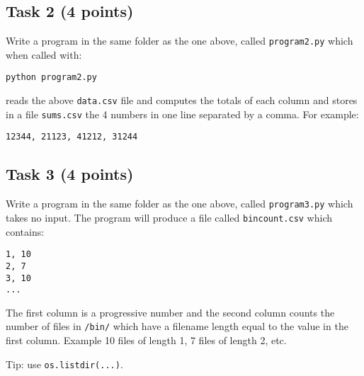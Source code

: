 \documentclass[12pt]{article}
\begin{document}
\subsection{Task 2 (4 points)}

Write a program in the same folder as the one above, called {\tt program2.py} which when called with:

\begin{verbatim}
python program2.py
\end{verbatim}

reads the above {\tt data.csv} file and computes the totals of each column and stores in a file {\tt sums.csv} the 4 numbers in one line separated by a comma. For example:

\begin{verbatim}
12344, 21123, 41212, 31244
\end{verbatim}

\subsection{Task 3 (4 points)}

Write a program in the same folder as the one above, called {\tt program3.py} which takes no input. The program will produce a file called {\tt bincount.csv} which contains:

\begin{verbatim}
1, 10
2, 7
3, 10
...
\end{verbatim}

The first column is a progressive number and the second column counts the number of files in {\tt /bin/} which have a filename length equal to the value in the first column. Example 10 files of length 1, 7 files of length 2, etc.

Tip: use {\tt os.listdir(...)}.
\end{document}
